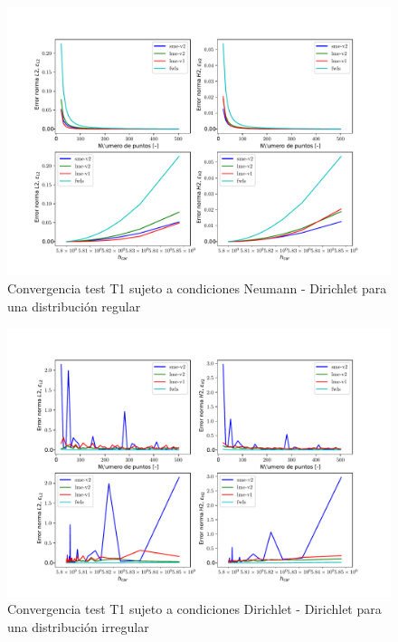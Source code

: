 \begin{figure}
    \centering
    \includegraphics[width=1\textwidth]{./Imagenes/06/comparacion_shp_regular/T1_regular_type-2_caso-3_direct_dgesv-lapack-blas_sme-v2_lme-v2_lme-v1_fwls.pdf}
    \caption{Convergencia test T1 sujeto a condiciones Neumann - Dirichlet para una distribución regular} \label{fig:T1_caso-3_conv}
\end{figure}
\begin{figure}
    \centering
    \includegraphics[width=1\textwidth]{./Imagenes/06/comparacion_shp_irreg/T1_irreg_type-2_caso-1_direct_dgesv-lapack-blas_sme-v2_lme-v2_lme-v1_fwls.pdf}
    \caption{Convergencia test T1 sujeto a condiciones Dirichlet - Dirichlet para una distribución irregular} \label{fig:T1_caso-1_conv_irreg}
\end{figure}
